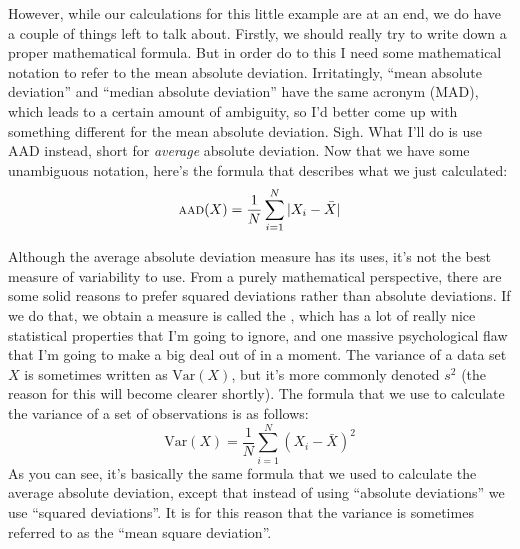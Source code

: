 However, while our calculations for this little example are at an end, we do have a couple of things left to talk about. Firstly, we should really try to write down a proper mathematical formula. But in order do to this I need some mathematical notation to refer to the mean absolute deviation. Irritatingly, ``mean absolute deviation'' and ``median absolute deviation'' have the same acronym (MAD), which leads to a certain amount of ambiguity, so I'd better come up with something different for the mean absolute deviation. Sigh. What I'll do is use AAD instead, short for {\it average} absolute deviation. Now that we have some unambiguous notation, here's the formula that describes what we just calculated:\\
$$
\mbox{\textsc{aad}}(X) = \frac{1}{N} \sum_{i = 1}^N |X_i - \bar{X}|
$$



Although the average absolute deviation measure has its uses, it's not the best measure of variability to use. From a purely mathematical perspective, there are some solid reasons to prefer squared deviations rather than absolute deviations. If we do that, we obtain a measure is called the , which has a lot of really nice statistical properties that I'm going to ignore, and one massive psychological flaw that I'm going to make a big deal out of in a moment. The variance of a data set $X$ is sometimes written as $\mbox{Var}(X)$, but it's more commonly denoted $s^2$ (the reason for this will become clearer shortly). The formula that we use to calculate the variance of a set of observations is as follows:
$$
\mbox{Var}(X) = \frac{1}{N} \sum_{i=1}^N \left( X_i - \bar{X} \right)^2
$$
As you can see, it's basically the same formula that we used to calculate the average absolute deviation, except that instead of using ``absolute deviations'' we use ``squared deviations''. It is for this reason that the variance is sometimes referred to as the ``mean square deviation''.

